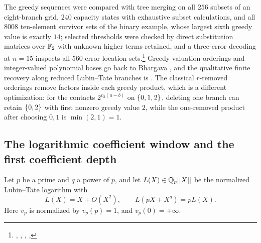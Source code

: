 The greedy sequences were compared with tree merging on all $256$ subsets of an
eight-branch grid, $240$ capacity states with exhaustive subset calculations, and all
$8008$ ten-element survivor sets of the binary example, whose largest sixth greedy value is
exactly $14$; selected thresholds were checked by direct substitution matrices over $\mathbb{F}_2$
with unknown higher terms retained, and a three-error decoding at $n=15$ inspects all $560$
error-location
sets.\footnote{\raggedright{},
,
,
,
}
Greedy valuation orderings and integer-valued polynomial bases go back to Bhargava
\cite{Bhargava1997Porderings,Bhargava2009Porderings}, and the qualitative finite recovery
along reduced Lubin--Tate branches is \cite[Lemma~4.2]{BergerSprang2025Integer}. The
classical $r$-removed orderings \cite{Johnson2010Removed,KrachunMirgalimova2024Greedoid}
remove factors inside each greedy product, which is a different optimization: for the
contacts $2^{v_2(a-b)}$ on $\{0,1,2\}$, deleting one branch can retain $\{0,2\}$ with
first nonzero greedy value $2$, while the one-removed product after choosing $0,1$ is
$\min(2,1)=1$.

\subsection{The logarithmic coefficient window and the first coefficient depth}\label{lub:ssec:depth}
\begingroup\raggedright{}\endgroup

Let $p$ be a prime and $q$ a power of $p$, and let $L(X)\in\mathbb{Q}_p[[X]]$ be the normalized
Lubin--Tate logarithm with
\[
 L(X)=X+O(X^2),\qquad L(pX+X^q)=pL(X).
\]
Here $v_p$ is normalized by $v_p(p)=1$, and $v_p(0)=+\infty$.

